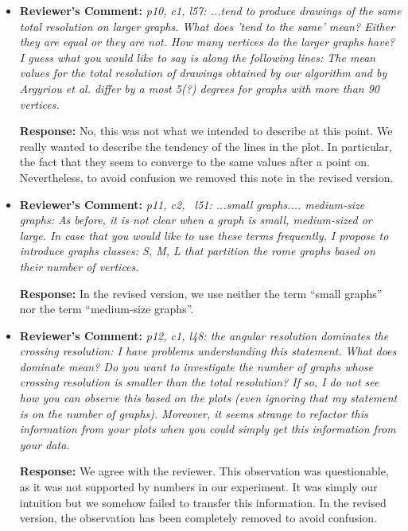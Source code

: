 \documentclass{article}
\newcommand{\rcomment}[1]{\vspace{0.3cm} \item \textbf{Reviewer's Comment:} {\em #1}}
\newcommand{\response}{\vspace{0.2cm} \textbf{Response: }}
\begin{document}
\begin{itemize}
\rcomment{p10, c1, l57: ...tend to produce drawings of the same total resolution on larger graphs.
%
What does 'tend to the same' mean? Either they are equal or they are not. 
%
How many vertices do the larger graphs have?    
%
I guess what you would like to say is along the following lines:
%
The mean values for the total resolution of drawings obtained by our algorithm and by Argyriou et al. differ by a most 5(?) degrees for graphs with more than 90 vertices.}

\response{No, this was not what we intended to describe at this point. We really wanted to describe the tendency of the lines in the plot. In particular, the fact that they seem to converge to the same values after a point on. Nevertheless, to avoid confusion we removed this note in the revised version.}

\rcomment{p11, c2, ~l51: ...small graphs.... medium-size graphs:
%
As before, it is not clear when a graph is small, medium-sized or large. In case that you would like to use these terms frequently, I propose to introduce graphs classes: S, M, L that partition the rome graphs based on their number of vertices.}

\response{In the revised version, we use neither the term ``small graphs'' nor the term ``medium-size graphs''.}

\rcomment{p12, c1, l48: the angular resolution dominates the crossing resolution:
%
I have problems understanding this statement. What does dominate mean?  Do you want to investigate the number of graphs whose crossing resolution is smaller than the total resolution? If so, I do not see how you can observe this based on the plots (even ignoring that my statement is on the number of graphs). Moreover, it seems strange to refactor this information from your plots when you could simply get this information from your data.}

\response{We agree with the reviewer. This observation was questionable, as it was not supported by numbers in our experiment. It was simply our intuition but we somehow failed to transfer this information. In the revised version, the observation has been completely removed to avoid confusion.}
        
\end{itemize} 
\end{document}
